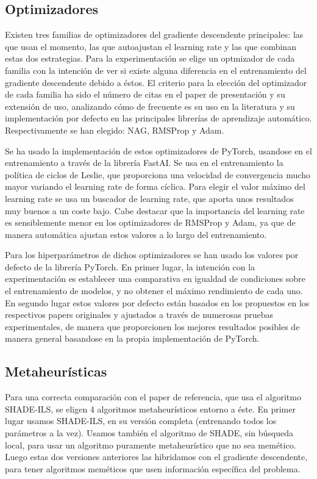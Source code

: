 \subsection{Optimizadores}

Existen tres familias de optimizadores del gradiente descendente principales: las que usan el momento, las que autoajustan el learning rate y las que combinan estas dos estrategias. Para la experimentación se elige un optmizador de cada familia con la intención de ver si existe alguna diferencia en el entrenamiento del gradiente descendente debido a éstos. El criterio para la elección del optimizador de cada familia ha sido el número de citas en el paper de presentación y su extensión de uso, analizando cómo de frecuente es su uso en la literatura y su implementación por defecto en las principales librerías de aprendizaje automático. Respectivamente se han elegido: NAG, RMSProp y Adam.

Se ha usado la implementación de estos optimizadores de PyTorch, usandose en el entrenamiento a través de la librería FastAI. Se usa en el entrenamiento la política de ciclos de Leslie, que proporciona una velocidad de convergencia mucho mayor variando el learning rate de forma cíclica. Para elegir el valor máximo del learning rate se usa un buscador de learning rate, que aporta unos resultados muy buenos a un coste bajo. Cabe destacar que la importancia del learning rate es sensiblemente menor en los optimizadores de RMSProp y Adam, ya que de manera automática ajustan estos valores a lo largo del entrenamiento. 

Para los hiperparámetros de dichos optimizadores se han usado los valores por defecto de la librería PyTorch. En primer lugar, la intención con la experimentación es establecer una comparativa en igualdad de condiciones sobre el entrenamiento de modelos, y no obtener el máximo rendimiento de cada uno. En segundo lugar estos valores por defecto están basados en los propuestos en los respectivos papers originales y ajustados a través de numerosas pruebas experimentales, de manera que proporcionen los mejores resultados posibles de manera general basandose en la propia implementación de PyTorch. 


\subsection{Metaheurísticas}

Para una correcta comparación con el paper de referencia, que usa el algoritmo SHADE-ILS, se eligen 4 algoritmos metaheurísticos entorno a éste. En primer lugar usamos SHADE-ILS, en su versión completa (entrenando todos los parámetros a la vez). Usamos también el algoritmo de SHADE, sin búsqueda local, para usar un algoritmo puramente metaheurístico que no sea memético. Luego estas dos versiones anteriores las hibridamos con el gradiente descendente, para tener algoritmos meméticos que usen información específica del problema. 

